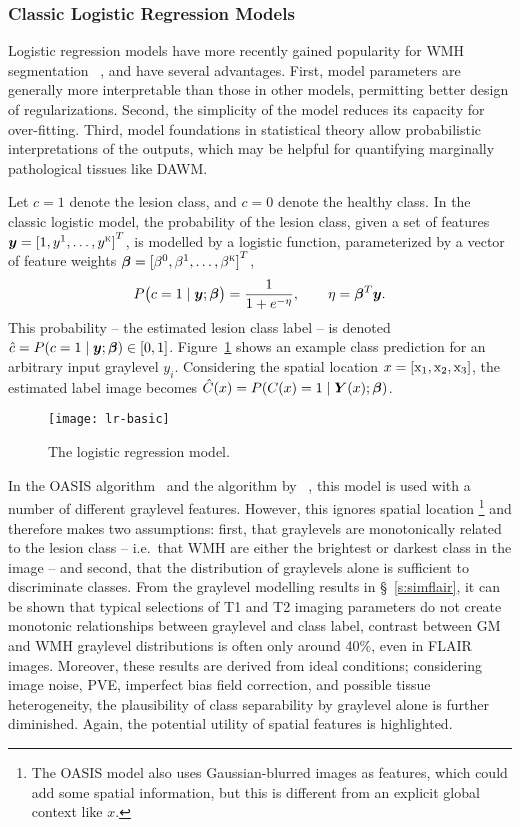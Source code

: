 \subsubsection{Classic Logistic Regression Models}\label{sss:limits-lr}
Logistic regression models have more recently gained popularity for WMH segmentation%
~\cite{Sweeney2013a,Sweeney2013,Schmidt2017a,Zhan2017}, and have several advantages.
First, model parameters are generally more interpretable than those in other models,
permitting better design of regularizations.
Second, the simplicity of the model reduces its capacity for over-fitting.
Third, model foundations in statistical theory allow probabilistic interpretations of the outputs,
which may be helpful for quantifying marginally pathological tissues like DAWM.
\par
Let $c=1$ denote the lesion class, and $c=0$ denote the healthy class.
In the classic logistic model,
the probability of the lesion class,
given a set of features $\bm{y} = {[1,y^1,\dots,y^{\textsc{k}}]}^T$,
is modelled by a logistic function,
parameterized by a vector of feature weights $\bm{\beta} = {[\beta^0,\beta^1,\dots,\beta^{\textsc{k}}]}^T$,
\begin{equation}
P\big(c=1\mid\by;\bb\big) = \frac{1}{1+e^{-\eta}},\qquad\eta = \bb^T\by.%
\label{eq:lrmodel-basic}
\end{equation}
This probability -- the estimated lesion class label --
is denoted $\hat{c} = P(c=1\mid\bm{y};\bm{\beta}) \in [0,1]$.
Figure~\ref{fig:lr-basic} shows an example class prediction for an arbitrary input graylevel $y_i$.
Considering the spatial location $x = [\mathrm{x}_1,\mathrm{x}_2,\mathrm{x}_3]$,
the estimated label image becomes $\hat{C}(x) = P(C(x)=1\mid\bm{Y}(x);\bm{\beta})$.
\par
\begin{figure}
  \centering\texttt{[image: lr-basic]}
  \caption{The logistic regression model.}%
  \label{fig:lr-basic}
\end{figure}
In the OASIS algorithm~\cite{Sweeney2013a,Sweeney2013}
and the algorithm by \citeauthor{Zhan2017}~\cite{Zhan2017},
this model is used with a number of different graylevel features.
However, this ignores spatial location%
\footnote{The OASIS model also uses Gaussian-blurred images as features,
  which could add some spatial information,
  but this is different from an explicit global context like $x$.}
and therefore makes two assumptions:
first, that graylevels are monotonically related to the lesion class
-- i.e.\ that WMH are either the brightest or darkest class in the image -- 
and second, that the distribution of graylevels alone is sufficient to discriminate classes.
From the graylevel modelling results in \S~\ref{s:simflair},
it can be shown that typical selections of T1 and T2 imaging parameters
do not create monotonic relationships between graylevel and class label,
contrast between GM and WMH graylevel distributions
is often only around 40\%, even in FLAIR images.
Moreover, these results are derived from ideal conditions;
considering image noise, PVE, imperfect bias field correction, and possible tissue heterogeneity,
the plausibility of class separability by graylevel alone is further diminished.
Again, the potential utility of spatial features is highlighted.
